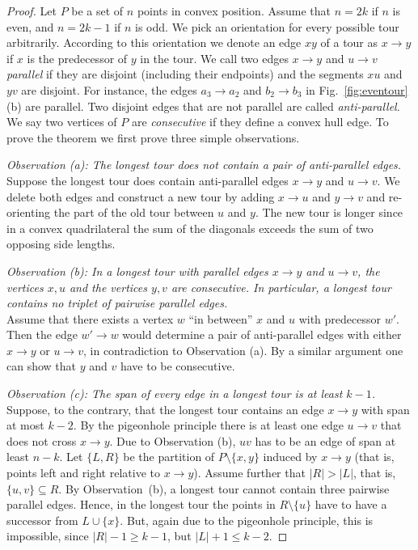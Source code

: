 \documentclass[11pt]{article}
\newcommand{\ar}{\rightarrow}
\begin{document}
\begin{proof}
Let $P$ be a set of $n$ points in convex position. Assume that $n=2k$
if $n$ is even, and $n=2k-1$ if $n$ is odd.
We pick an orientation for every possible tour arbitrarily.
 According to this orientation we denote an edge $xy$ of a tour as
 $x\ar y$ if $x$ is the
predecessor of $y$ in the tour. We call two edges $x\ar y$ and $u\ar
v$ \emph{parallel} if they are disjoint (including their endpoints)
and the segments $xu$ and $yv$ are disjoint. 
For instance, the edges $a_3\ar a_2$ and $b_2 \ar b_3$ in
Fig.~\ref{fig:eventour}(b) are parallel. Two disjoint edges that are not
parallel are called \emph{anti-parallel}.
We say two vertices of $P$ are \emph{consecutive} if they define a convex hull edge.
To prove the theorem we first prove three simple observations.

\medskip\noindent
{\it Observation (a): The longest tour does not contain
a pair of anti-parallel edges.}\\ 
Suppose the longest tour does contain anti-parallel edges $x\ar y$ and
$u \ar v$. We delete both edges and construct a new tour by adding
$x\ar u$ and $y\ar v$ and re-orienting the part of the old tour
between $u$ and $y$. The new tour is longer since in a convex
quadrilateral the sum of the diagonals exceeds the sum of two opposing
side lengths. 

\medskip\noindent
{\it Observation (b): In a longest tour with parallel edges
$x\ar y$ and $u\ar v$, the vertices $x,u$ and the vertices $y,v$ are
consecutive. In particular, a longest tour contains no triplet of
pairwise parallel edges.} \\ 
Assume that there exists a vertex $w$ ``in between'' $x$ and $u$
with predecessor $w'$. Then the edge $w'\ar w$ 
would determine a pair of anti-parallel edges with either 
$x\ar y$ or $u\ar v$, in contradiction to Observation (a).
By a similar argument one can show that $y$ and $v$ have to be consecutive. 


\medskip\noindent
{\it Observation (c): The span of every edge in a longest
tour is at least $k-1$.} \\
Suppose, to the contrary, that the longest tour contains an edge
$x \ar y$ with span at most $k-2$. By the pigeonhole principle
there is at least one edge $u\ar v$ that does not cross $x \ar y$.
Due to Observation (b), $uv$ has to be an edge of span at least $n-k$.
Let $\{L,R\}$ be the partition of $P\setminus \{x,y\}$ induced by $x \ar y$
(that is, points left and right relative to $x \ar y$). Assume further that
$|R|>|L|$, that is, $\{u,v\}\subseteq R$. By Observation~(b),
a longest tour cannot contain three pairwise parallel edges. Hence,
in the longest tour the points in $R\setminus \{u\}$ have to have a
successor from $L\cup \{x\}$. But, again due to the pigeonhole principle,
this is impossible, since $|R|-1 \geq k-1$, but $|L|+1 \leq k-2$. 


\end{proof}
\end{document}
